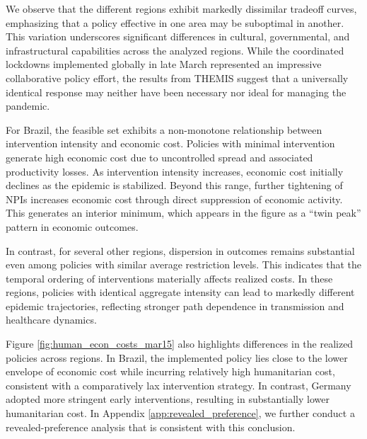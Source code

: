 \documentclass[msom,blindrev]{informs3} %
\begin{document}
{\color{blue}
We observe that the different regions exhibit markedly dissimilar tradeoff curves, emphasizing that a policy effective in one area may be suboptimal in another. This variation underscores significant differences in cultural, governmental, and infrastructural capabilities across the analyzed regions. While the coordinated lockdowns implemented globally in late March represented an impressive collaborative policy effort, the results from THEMIS suggest that a universally identical response may neither have been necessary nor ideal for managing the pandemic. 

For Brazil, the feasible set exhibits a non-monotone relationship between intervention intensity and economic cost. Policies with minimal intervention generate high economic cost due to uncontrolled spread and associated productivity losses. As intervention intensity increases, economic cost initially declines as the epidemic is stabilized. Beyond this range, further tightening of NPIs increases economic cost through direct suppression of economic activity. This generates an interior minimum, which appears in the figure as a “twin peak” pattern in economic outcomes.

In contrast, for several other regions, dispersion in outcomes remains substantial even among policies with similar average restriction levels. This indicates that the temporal ordering of interventions materially affects realized costs. In these regions, policies with identical aggregate intensity can lead to markedly different epidemic trajectories, reflecting stronger path dependence in transmission and healthcare dynamics.

Figure \ref{fig:human_econ_costs_mar15} also highlights differences in the realized policies across regions. In Brazil, the implemented policy lies close to the lower envelope of economic cost while incurring relatively high humanitarian cost, consistent with a comparatively lax intervention strategy. In contrast, Germany adopted more stringent early interventions, resulting in substantially lower humanitarian cost. In Appendix \ref{app:revealed_preference}, we further conduct a revealed-preference analysis that is consistent with this conclusion.

}
\end{document}
